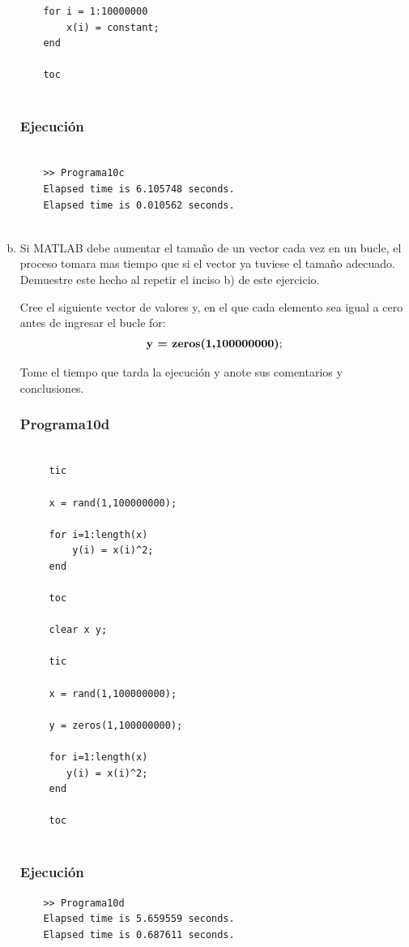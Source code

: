 \documentclass{article}
\begin{document}
\begin{enumerate}[a)]
\begin{lstlisting}
	for i = 1:10000000
		x(i) = constant;
	end
	
	toc
	
	\end{lstlisting}
	
	\subsubsection{Ejecución}
	
	\begin{lstlisting}
		
	>> Programa10c
	Elapsed time is 6.105748 seconds.
	Elapsed time is 0.010562 seconds.
	
	\end{lstlisting}
	
	\item Si MATLAB debe aumentar el tamaño de un vector cada vez en un bucle, el proceso tomara mas tiempo que si el vector ya tuviese el tamaño adecuado. Demuestre este hecho al repetir el inciso b) de este ejercicio.
	
	Cree el siguiente vector de valores y, en el que cada elemento sea igual a cero antes de ingresar el bucle for:
	\begin{align*}
		\centering
		\textbf{y = zeros(1,100000000)};
	\end{align*}
	
	 Tome el tiempo que tarda la ejecución y anote sus comentarios y conclusiones.
	 
	 \subsubsection{Programa10d}
	 
	 \begin{lstlisting}
	 
	 tic
	 
	 x = rand(1,100000000);
	 
	 for i=1:length(x)
		 y(i) = x(i)^2;
	 end
	 
	 toc
	 
	 clear x y;
	 
	 tic
	 
	 x = rand(1,100000000);
	 
	 y = zeros(1,100000000);
	 
	 for i=1:length(x)
	 	y(i) = x(i)^2;
	 end
	 
	 toc
	 
	 \end{lstlisting}
 	
 	\subsubsection{Ejecución}
 	
 	\begin{lstlisting}
 	>> Programa10d
 	Elapsed time is 5.659559 seconds.
 	Elapsed time is 0.687611 seconds.
 	\end{lstlisting}
	 
	\end{enumerate}
	
\end{document}
